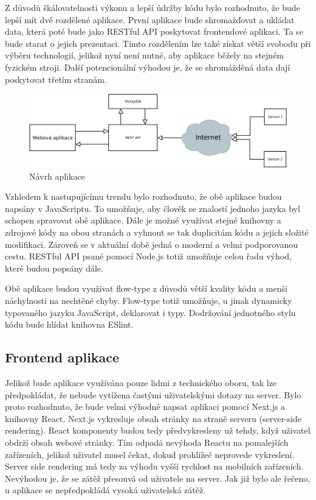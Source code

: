 \documentclass[thesis=M,czech]{FITthesis}[2018/10/20]
\begin{document}
	 Z důvodů škálovatelnosti výkonu a lepší údržby kódu bylo rozhodnuto, že bude lepší mít dvě rozdělené aplikace. První aplikace bude shromažďovat a ukládat data, která poté bude jako RESTful API poskytovat frontendové aplikaci. Ta se bude starat o jejich prezentaci. Tímto rozdělením lze také získat větší svobodu při výběru technologií, jelikož nyní není nutné, aby aplikace běžely na stejném fyzickém stroji. Další potencionální výhodou je, že se shromážděná data dají poskytovat třetím stranám.
	
\begin{figure}[h]
\caption{Návrh aplikace}
\centering
\includegraphics[width=1\textwidth]{diagrams/navrh-aplikace}
\end{figure}


Vzhledem k nastupujícímu trendu bylo rozhodnuto, že obě aplikace budou napsány v JavaScriptu. To umožňuje, aby člověk se znalostí jednoho jazyka byl schopen spravovat obě aplikace. Dále je možné využívat stejné knihovny a zdrojové kódy na obou stranách a vyhnout se tak duplicitám kódu a jejich složité modifikaci. Zároveň se v aktuální době jedná o moderní a velmi podporovanou cestu. RESTful API psané pomocí Node.js totiž umožňuje celou řadu výhod, které budou popsány dále.

Obě aplikace budou využívat flow-type z důvodů větší kvality kódu a menší náchylnosti na nechtěné chyby. Flow-type totiž umožňuje, u jinak dynamicky typovaného jazyku JavaScript, deklarovat i typy. Dodržování jednotného stylu kódu bude hlídat knihovna ESlint.
	
\subsection{Frontend aplikace}
	Jelikož bude aplikace využívána pouze lidmi z technického oboru, tak lze předpokládat, že nebude vytížena častými uživatelskými dotazy na server. Bylo proto rozhodnuto, že bude velmi výhodné napsat aplikaci pomocí Next.js a knihovny React. Next.js vykresluje obsah stránky na straně serveru (server-side rendering). React komponenty budou tedy předvykresleny už tehdy, když uživatel obdrží obsah webové stránky. Tím odpadá nevýhoda Reactu na pomalejších zařízeních, jelikož uživatel musel čekat, dokud prohlížeč neprovede vykreslení. Server side rendering má tedy za výhodu vyšší rychlost na mobilních zařízeních. Nevýhodou je, že se zátěž přesouvá od uživatele na server. Jak již bylo ale řečeno, u aplikace se nepředpokládá vysoká uživatelská zátěž.
	
\end{document}
